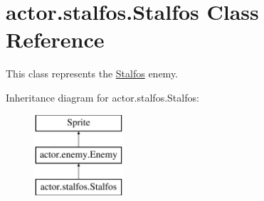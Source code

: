 \hypertarget{classactor_1_1stalfos_1_1_stalfos}{}\section{actor.\+stalfos.\+Stalfos Class Reference}
\label{classactor_1_1stalfos_1_1_stalfos}


This class represents the \hyperlink{classactor_1_1stalfos_1_1_stalfos}{Stalfos} enemy.  


Inheritance diagram for actor.\+stalfos.\+Stalfos\+:\begin{figure}[H]
\begin{center}
\leavevmode
\includegraphics[height=3.000000cm]{classactor_1_1stalfos_1_1_stalfos}
\end{center}
\end{figure}
